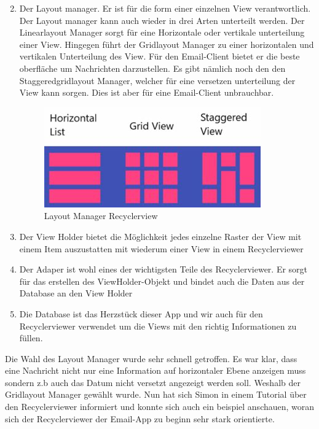 \documentclass[a4paper,11pt]{article}
\begin{document}
\begin{enumerate}

    \setcounter{enumi}{1}
    \item Der Layout manager. Er ist für die form einer einzelnen View verantwortlich. 
Der Layout manager kann auch wieder in drei Arten unterteilt werden. Der Linearlayout Manager sorgt für eine 
Horizontale oder vertikale unterteilung einer View. Hingegen führt der Gridlayout Manager zu einer horizontalen 
und vertikalen Unterteilung des View. Für den Email-Client bietet er die  
beste oberfläche um Nachrichten darzustellen. Es gibt nämlich noch den den Staggeredgridlayout Manager, welcher 
für eine versetzen unterteilung der View kann sorgen. Dies ist aber für eine Email-Client unbrauchbar. 

\begin{figure}[H]
    \centering
    \includegraphics[width=.4\textwidth]{media/RecyclerviewLayoutManagerCropt.jpeg}
    \caption{Layout Manager Recyclerview \cite{LayoutManagerPicture}}
\end{figure}

    \item Der View Holder bietet die Möglichkeit jedes einzelne Raster der View mit einem Item auszustatten mit wiederum einer View in einem Recyclerviewer

    \item Der Adaper ist wohl eines der wichtigsten Teile des Recyclerviewer. Er sorgt für das erstellen des ViewHolder-Objekt und
bindet auch die Daten aus der Database an den View Holder

    \item Die Database ist das Herzstück dieser App und wir auch für den Recyclerviewer verwendet um die 
Views mit den richtig Informationen zu füllen. 

\end{enumerate}

Die Wahl des Layout Manager wurde sehr schnell getroffen. Es war klar, dass eine Nachricht nicht nur eine Information auf horizontaler Ebene anzeigen muss sondern
z.b auch das Datum nicht versetzt angezeigt werden soll. Weshalb der Gridlayout Manager gewählt wurde. Nun hat sich Simon in einem Tutorial über den Recyclerviewer informiert
und konnte sich auch ein beispiel anschauen, woran sich der Recyclerviewer der Email-App zu beginn sehr stark orientierte. \\
\end{document}
